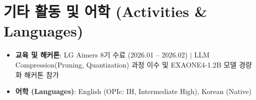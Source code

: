 \documentclass[letterpaper,10pt]{article}
\newcommand{\resumeItem}[1]{\item\small{#1}}
\newcommand{\resumeSubHeadingList}{\begin{itemize}[leftmargin=0.15in, label={}]}
\newcommand{\resumeSubHeadingListEnd}{\end{itemize}}
\begin{document}
\section{기타 활동 및 어학 (Activities \& Languages)}
\resumeSubHeadingList
  \resumeItem{\textbf{교육 및 해커톤}: LG Aimers 8기 수료 (2026.01 -- 2026.02) $|$ LLM Compression(Pruning, Quantization) 과정 이수 및 EXAONE4-1.2B 모델 경량화 해커톤 참가}
  \resumeItem{\textbf{어학 (Languages)}: English (OPIc: IH, Intermediate High), Korean (Native)}
\resumeSubHeadingListEnd
\end{document}

